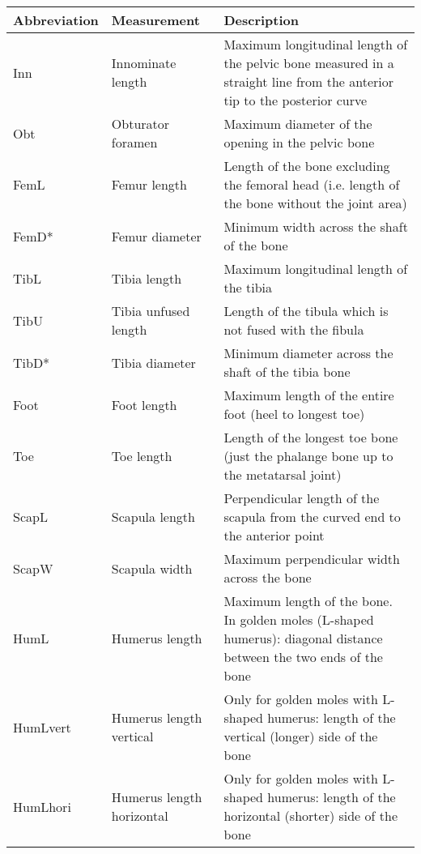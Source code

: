 

\begin{tabular}{lp{3.5cm}p{9.75cm}}
\hline
\textbf{Abbreviation} & \textbf{Measurement} & \textbf{Description}\\
\hline
Inn & Innominate length & Maximum longitudinal length of the pelvic bone measured in a straight line from the anterior tip to the posterior curve \\ 
Obt & Obturator foramen & Maximum diameter of the opening in the pelvic bone \\
FemL & Femur length & Length of the bone excluding the femoral head (i.e. length of the bone without the joint area)  \\
FemD* & Femur diameter & Minimum width across the shaft of the bone \\
TibL & Tibia length & Maximum longitudinal length of the tibia  \\
TibU & Tibia unfused length & Length of the tibula which is not fused with the fibula \\
TibD* & Tibia diameter & Minimum diameter across the shaft of the tibia bone \\
Foot & Foot length & Maximum length of the entire foot (heel to longest toe) \\
Toe & Toe length & Length of the longest toe bone (just the phalange bone up to the metatarsal joint) \\
ScapL & Scapula length & Perpendicular length of the scapula from the curved end to the anterior point  \\
ScapW & Scapula width & Maximum perpendicular width across the bone \\
HumL & Humerus length & Maximum length of the bone. In golden moles (L-shaped humerus): diagonal distance between the two ends of the bone  \\
HumLvert & Humerus length vertical & Only for golden moles with L-shaped humerus: length of the vertical (longer) side of the bone \\
HumLhori & Humerus length horizontal & Only for golden moles with L-shaped humerus: length of the horizontal (shorter) side of the bone \\

\end{tabular}
